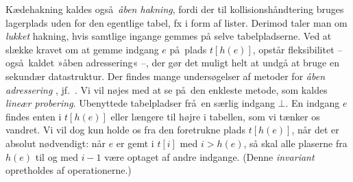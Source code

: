 Kædehakning kaldes også \emph{åben hakning},
fordi der til kollisionshåndtering bruges lagerplads uden for den egentlige tabel, fx i form af lister.
Derimod taler man om \emph{lukket} hakning, hvis samtlige ingange gemmes på selve tabelpladserne.
Ved at slække kravet om at gemme indgang $e$ på plads $t[h(e)]$, opstår fleksibilitet -- også kaldet »åben adressering« --, der gør det muligt helt at undgå at bruge en sekundær datastruktur.
Der findes mange undersøgelser af metoder for \emph{åben adressering} \cite{Pet57}, jf.~\cite[kap.~3.3]{GonBY1991}.
Vi vil nøjes med at se på den enkleste metode, som kaldes \emph{lineær probering}.
Ubenyttede tabelpladser frå en særlig indgang $\bot$.
En indgang $e$ findes enten i $t[h(e)]$ eller længere til højre i tabellen, som vi tænker os vandret.
Vi vil dog kun holde os fra den foretrukne plads $t[h(e)]$, når det er absolut nødvendigt:
når $e$ er gemt i $t[i]$ med $i>h(e)$, så skal alle plaserne fra  $h(e)$ til og med $i-1$ være optaget af andre indgange.
(Denne \emph{invariant}
opretholdes af operationerne.)

